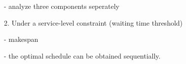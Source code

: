 \documentclass{article}
\newcommand{\Z}{\mathbf{Z}}
\newcommand{\D}{\bm{\Delta}}
\begin{document}
- analyze three components seperately


2. Under a service-level constraint (waiting time threshold)

- makespan

- the optimal schedule can be obtained sequentially.









\end{document}
